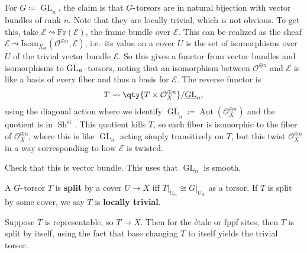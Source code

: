 \begin{example}[?]

For \(G \coloneqq\underline{\operatorname{GL}}_n\), the claim is that
\(G{\hbox{-}}\)torsors are in natural bijection with vector bundles of
rank \(n\). Note that they are locally trivial, which is not obvious. To
get this, take \(\mathcal{E}\leadsto \mathrm{Fr}(\mathcal{E})\), the
frame bundle over \(\mathcal{E}\). This can be realized as the sheaf
\(\mathcal{E}\leadsto \mathrm{Isom}_{X_\text{ét}}({\mathcal{O}}^{\oplus n}, \mathcal{E})\),
i.e.~its value on a cover \(U\) is the set of isomorphisms over \(U\) of
the trivial vector bundle \(\mathcal{E}\). So this gives a functor from
vector bundles and isomorphisms to
\(\operatorname{GL}_n{\hbox{-}}\)torsors, noting that an isomorphism
between \({\mathcal{O}}^{\oplus n}\) and \(\mathcal{E}\) is like a basis
of every fiber and thus a basis for \(\mathcal{E}\). The reverse functor
is
\begin{align*}  
T \leadsto \qty{T\times{\mathcal{O}}_X^{\oplus n}} / \underline{\operatorname{GL}}_n
,\end{align*}
using the diagonal action where we identify
\(\underline{\operatorname{GL}}_n \coloneqq\underline{{\operatorname{Aut}}}({\mathcal{O}}_X^{\oplus n})\)
and the quotient is in \({\operatorname{Sh}}^\text{ét}\). This quotient
kills \(T\), so each fiber is isomorphic to the fiber of
\({\mathcal{O}}_X^{\oplus n}\), where this is like
\(\operatorname{GL}_n\) acting simply transitively on \(T\), but this
twist \({\mathcal{O}}_X^{\oplus n}\) in a way corresponding to how
\(\mathcal{E}\) is twisted.

\begin{exercise}[?]

Check that this is vector bundle. This uses that \(\operatorname{GL}_n\)
is smooth.

\end{exercise}

\end{example}

\begin{definition}[?]

A \(G{\hbox{-}}\)torsor \(T\) is \textbf{split} by a cover \(U\to X\)
iff
\({ \left.{{T}} \right|_{{U_\text{ét}}} } \cong { \left.{{G}} \right|_{{U_\text{ét}}} }\)
as a torsor. If \(T\) is split by some cover, we say \(T\) is
\textbf{locally trivial}.

\end{definition}

\begin{remark}

Suppose \(T\) is representable, so \(T\to X\). Then for the étale or
fppf sites, then \(T\) is split by itself, using the fact that base
changing \(T\) to itself yields the trivial torsor.

\end{remark}


